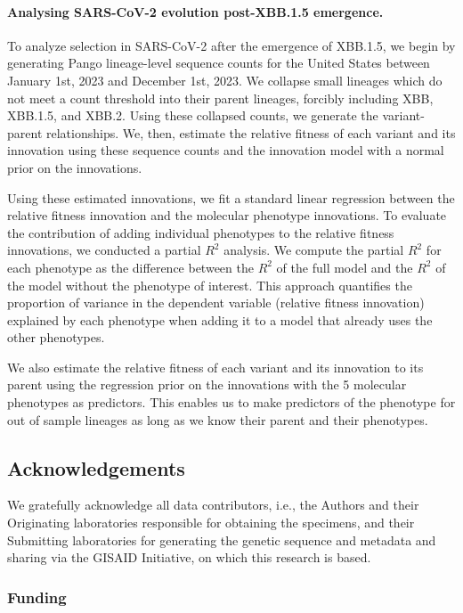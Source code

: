 \paragraph{Analysing SARS-CoV-2 evolution post-XBB.1.5 emergence.}

To analyze selection in SARS-CoV-2 after the emergence of XBB.1.5, we begin by generating Pango lineage-level sequence counts for the United States between January 1st, 2023 and December 1st, 2023. 
We collapse small lineages which do not meet a count threshold into their parent lineages, forcibly including XBB, XBB.1.5, and XBB.2.
Using these collapsed counts, we generate the variant-parent relationships.
We, then, estimate the relative fitness of each variant and its innovation using these sequence counts and the innovation model with a normal prior on the innovations.

Using these estimated innovations, we fit a standard linear regression between the relative fitness innovation and the molecular phenotype innovations.
To evaluate the contribution of adding individual phenotypes to the relative fitness innovations, we conducted a partial $R^2$ analysis.
We compute the partial $R^2$ for each phenotype as the difference between the $R^2$ of the full model and the $R^2$ of the model without the phenotype of interest.
This approach quantifies the proportion of variance in the dependent variable (relative fitness innovation) explained by each phenotype when adding it to a model that already uses the other phenotypes.

We also estimate the relative fitness of each variant and its innovation to its parent using the regression prior on the innovations with the 5 molecular phenotypes as predictors.
This enables us to make predictors of the phenotype for out of sample lineages as long as we know their parent and their phenotypes.

\subsection*{Acknowledgements}

We gratefully acknowledge all data contributors, i.e., the Authors and their Originating laboratories responsible for obtaining the specimens, and their Submitting laboratories for generating the genetic sequence and metadata and sharing via the GISAID Initiative, on which this research is based.

\subsubsection*{Funding}

